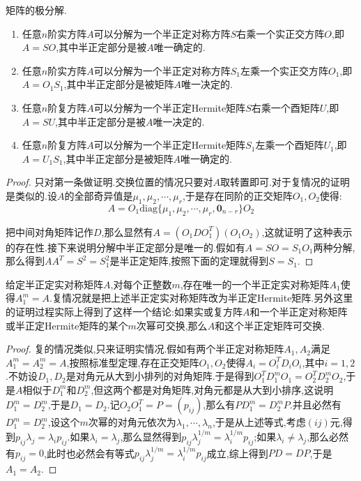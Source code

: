 矩阵的极分解.
\begin{enumerate}
	\item 任意$n$阶实方阵$A$可以分解为一个半正定对称方阵$S$右乘一个实正交方阵$O$,即$A=SO$,其中半正定部分是被$A$唯一确定的.
	\item 任意$n$阶实方阵$A$可以分解为一个半正定对称方阵$S_1$左乘一个实正交方阵$O_1$,即$A=O_1S_1$,其中半正定部分是被矩阵$A$唯一决定的.
	\item 任意$n$阶复方阵$A$可以分解为一个半正定Hermite矩阵$S$右乘一个酉矩阵$U$,即$A=SU$,其中半正定部分是被$A$唯一决定的.
	\item 任意$n$阶复方阵$A$可以分解为一个半正定Hermite矩阵$S_1$左乘一个酉矩阵$U_1$,即$A=U_1S_1$,其中半正定部分是被矩阵$A$唯一确定的.
\end{enumerate}
\begin{proof}
	
	只对第一条做证明.交换位置的情况只要对$A$取转置即可.对于复情况的证明是类似的.设$A$的全部奇异值是$\mu_1,\mu_2,\cdots,\mu_r$,于是存在同阶的正交矩阵$O_1,O_2$使得:
	$$A=O_1\mathrm{diag}\{\mu_1,\mu_2,\cdots,\mu_r,\textbf{0} _{n-r}\}O_2$$
	
	把中间对角矩阵记作$D$,那么显然有$A=(O_1DO_1^T)(O_1O_2)$,这就证明了这种表示的存在性.接下来说明分解中半正定部分是唯一的.假如有$A=SO=S_1O_1$两种分解,那么得到$AA^T=S^2=S_1^2$是半正定矩阵,按照下面的定理就得到$S=S_1$.
	
\end{proof}

给定半正定实对称矩阵$A$,对每个正整数$m$,存在唯一的一个半正定实对称矩阵$A_1$使得$A_1^m=A$.复情况就是把上述半正定实对称矩阵改为半正定Hermite矩阵.另外这里的证明过程实际上得到了这样一个结论:如果实或复方阵$A$和一个半正定对称矩阵或半正定Hermite矩阵的某个$m$次幂可交换,那么$A$和这个半正定矩阵可交换.
\begin{proof}
	
	复的情况类似,只来证明实情况.假如有两个半正定对称矩阵$A_1,A_2$满足$A_1^m=A_2^m=A$,按照标准型定理,存在正交矩阵$O_1,O_2$使得$A_i=O_i^TD_iO_i$,其中$i=1,2$.不妨设$D_1,D_2$是对角元从大到小排列的对角矩阵.于是得到$O_1^TD_1^mO_1=O_2^TD_2^mO_2$,于是$A$相似于$D_1^m$和$D_2^m$,但这两个都是对角矩阵,对角元都是从大到小排序,这说明$D_1^m=D_2^m$,于是$D_1=D_2$.记$O_2O_1^T=P=(p_{ij})$,那么有$PD_1^m=D_2^mP$.并且必然有$D_1^m=D_2^m$,设这个$m$次幂的对角元依次为$\lambda_1,\cdots,\lambda_n$,于是从上述等式,考虑$(ij)$元,得到$p_{ij}\lambda_j=\lambda_ip_{ij}$.如果$\lambda_i=\lambda_j$,那么显然得到$p_{ij}\lambda_j^{1/m}=\lambda_i^{1/m}p_{ij}$;如果$\lambda_i\not=\lambda_j$,那么必然有$p_{ij}=0$,此时也必然会有等式$p_{ij}\lambda_j^{1/m}=\lambda_i^{1/m}p_{ij}$成立,综上得到$PD=DP$,于是$A_1=A_2$.
	
\end{proof}

